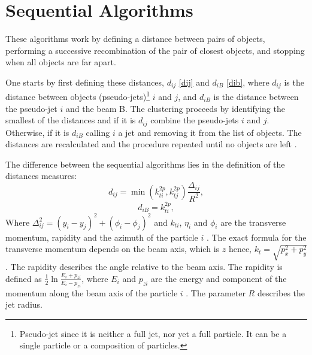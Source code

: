 \section{Sequential Algorithms}

These algorithms work by defining a distance between pairs of objects, performing a successive recombination of the pair of closest objects, and stopping when all objects are far apart.

One starts by first defining these distances, $d_{ij}$ \eqref{dij} and $d_{iB}$ \eqref{dib}, where $d_{ij}$ is the distance between objects (pseudo-jets)\footnote{Pseudo-jet since it is neither a full jet, nor yet a full particle. It can be a single particle or a composition of particles.}
$i$ and $j$, and $d_{iB}$ is the distance between the pseudo-jet $i$ and the beam B. The clustering proceeds by identifying the smallest of the distances and if it is $d_{ij}$ combine the pseudo-jets $i$ and $j$. Otherwise, if it is $d_{iB}$ calling $i$ a jet and removing it from the list of objects. The distances are recalculated and the procedure repeated until no objects are left \citep{Cacciari:2008gp}. 

The difference between the sequential algorithms lies in the definition of the distances measures:
\begin{equation}
d_{ij} = \min(k_{ti}^{2p}, k_{tj}^{2p}) \frac{\Delta_{ij}}{R^{2}},
\label{dij}\end{equation}         
\begin{equation}
d_{iB} = k_{ti}^{2p} ,
\label{dib}\end{equation}
Where $\Delta_{ij}^{2} = (y_{i} - y_{j})^2 + (\phi_{i} - \phi_{j})^2$ and $k_{ti}$, $\eta_{i}$ and $\phi_{i}$ are the transverse momentum, rapidity and  the azimuth of the particle $i$ \citep{Cacciari:2008gp}. The exact formula for the transverse momentum depends on the beam axis, which is $z$ hence, $k_{t} = \sqrt{p_x^2 + p_y^2}$. The rapidity describes the angle relative to the beam axis.
The rapidity is defined as $\frac{1}{2} \ln \frac{E_i + p_{zi}}{E_i - p_{zi}}$, where  $E_i$ and $p_{zi}$ are the energy and component of the momentum along the beam axis of the particle $i$ \citep{Cacciari:2011ma}. The parameter $R$ describes the jet radius. 

